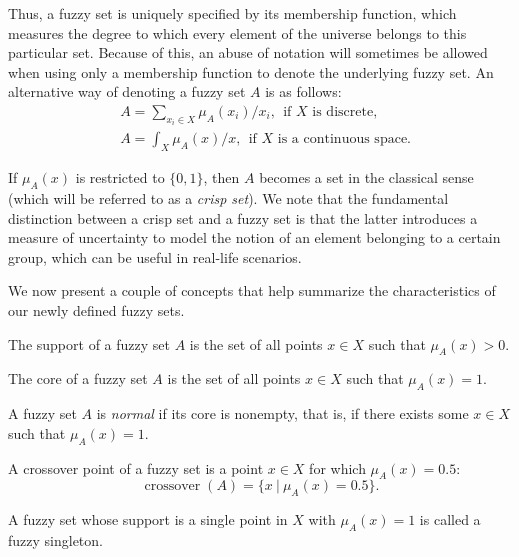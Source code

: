 Thus, a fuzzy set is uniquely specified by its membership function, which measures the degree to which every element of the universe belongs to this particular set. Because of this, an abuse of notation will sometimes be allowed when using only a membership function to denote the underlying fuzzy set. An alternative way of denoting a fuzzy set $A$ is as follows:
\begin{align*}
& A = \sum_{x_i \in X} \mu_A(x_i) \slash x_i, \ \ \text{if $X$ is discrete,} \\
& A = \int_X \mu_A(x) \slash x, \ \ \text{if $X$ is a continuous space.}
\end{align*}

\begin{remark}
	If $\mu_A(x)$ is restricted to $\{0,1\}$, then $A$ becomes a set in the classical sense (which will be referred to as a \textit{crisp set}). We note that the fundamental distinction between a crisp set and a fuzzy set is that the latter introduces a measure of uncertainty to model the notion of an element belonging to a certain group, which can be useful in real-life scenarios.
\end{remark}

We now present a couple of concepts that help summarize the characteristics of our newly defined fuzzy sets.

\begin{definition}[Support] The support of a fuzzy set $A$ is the set of all points $x \in X$ such that $\mu_A(x) > 0$.
\end{definition}

\begin{definition}[Core] The core of a fuzzy set $A$ is the set of all points $x \in X$ such that $\mu_A(x) = 1$.
\end{definition}

\begin{definition}[Normality] A fuzzy set $A$ is \textit{normal} if its core is nonempty, that is, if there exists some $x \in X$ such that $\mu_A(x) = 1$.
\end{definition}

\begin{definition} A crossover point of a fuzzy set is a point $x \in X$ for which $\mu_A(x) = 0.5$:
\[
\operatorname{crossover}(A) = \{ x \ | \ \mu_A(x) = 0.5 \}.
\]

\end{definition}

\begin{definition} A fuzzy set whose support is a single point in $X$ with $\mu_A(x) = 1$ is called a fuzzy singleton.

\end{definition}

